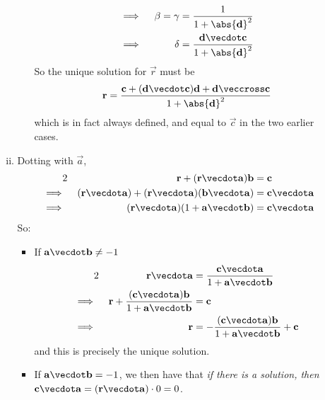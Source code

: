 \documentclass[fleqn,a4paper,11pt]{article}
\begin{document}
\begin{enumerate}
\begin{enumerate}[(i)]
\begin{itemize}
\begin{alignat*}
         \implies{}&&
            \beta = \gamma &= \frac 1{1 + \abs{\vec d}^2} \\
         \implies{}&&
            \delta &= \frac{\vec d \vecdot \vec c}{1 + \abs{\vec d}^2}
        \end{alignat*}
        So the unique solution for \(\vec r\) must be
        \begin{equation*}
         \vec r = \frac{\vec c + (\vec d \vecdot \vec c)\vec d
                        + \vec d \veccross \vec c}{1 + \abs{\vec d}^2}
        \end{equation*}
        which is in fact always defined, and equal to \(\vec c\) in the two
        earlier cases.
      \end{itemize}
     \item Dotting with \(\vec a\),
      \begin{alignat*}2
       && \vec r + (\vec r \vecdot \vec a)\vec b &= \vec c \\
       \implies{}&&
        (\vec r \vecdot \vec a)
        + (\vec r \vecdot \vec a)(\vec b \vecdot \vec a)
        &= \vec c \vecdot \vec a \\
       \implies{}&&
        (\vec r \vecdot \vec a)(1 + \vec a \vecdot \vec b)
        &= \vec c \vecdot \vec a
      \end{alignat*}
      So:
      \begin{itemize}
       \item If \(\vec a \vecdot \vec b \ne -1\)
        \begin{alignat*}2
         && \vec r \vecdot \vec a
          &= \frac{\vec c \vecdot \vec a}{1 + \vec a \vecdot \vec b} \\
         \implies{}&&
          \vec r + \frac{(\vec c \vecdot \vec a)\vec b}
                        {1 + \vec a \vecdot \vec b} &= \vec c \\
         \implies{}&&
          \vec r &= - \frac{(\vec c \vecdot \vec a)\vec b}
                            {1 + \vec a \vecdot \vec b} + \vec c
         \end{alignat*}
         and this is precisely the unique solution.
        \item
         If \(\vec a \vecdot \vec b = -1\), we then have that
         \emph{if there is a solution, then}
         \(\vec c \vecdot \vec a = (\vec r \vecdot \vec a)\cdot 0 = 0\).


\end{itemize}
\end{enumerate}
\end{enumerate}
\end{document}
